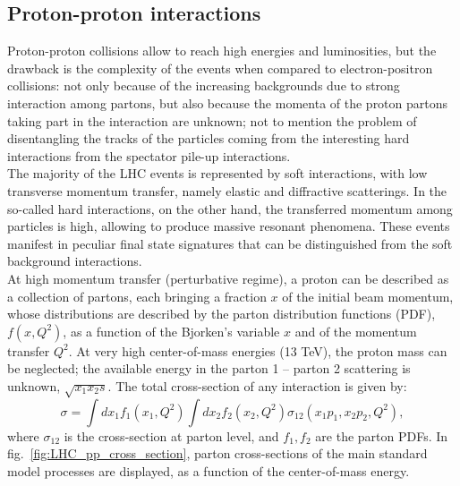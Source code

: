 \subsection{Proton-proton interactions}
\noindent Proton-proton collisions allow to reach high energies and luminosities, but the drawback is the complexity of the events when compared to electron-positron collisions: not only because of the increasing backgrounds due to strong interaction among partons, but also because the momenta of the proton partons taking part in the interaction are unknown; not to mention the problem of disentangling the tracks of the particles coming from the interesting hard interactions from the spectator pile-up interactions.\\
The majority of the LHC events is represented by soft interactions, with low transverse momentum transfer, namely elastic and diffractive scatterings. In the so-called hard interactions, on the other hand, the transferred momentum among particles is high, allowing to produce massive resonant phenomena. These events manifest in peculiar final state signatures that can be distinguished from the soft background interactions.\\
At high momentum transfer (perturbative regime), a proton can be described as a collection of partons, each bringing a fraction $x$ of the initial beam momentum, whose distributions are described by the parton distribution functions (PDF), $f(x,Q^2)$, as a function of the Bjorken's variable $x$ and of the momentum transfer $Q^2$. At very high center-of-mass energies (13 TeV), the proton mass can be neglected; the available energy in the parton 1 -- parton 2 scattering is unknown, $\sqrt{x_1 x_2 s}$. The total cross-section of any interaction is given by:
\begin{equation}
\sigma = \int dx_1 f_1(x_1,Q^2) \int dx_2 f_2(x_2,Q^2) \sigma_{12}(x_1 p_1, x_2 p_2, Q^2),
\end{equation}
where $\sigma_{12}$ is the cross-section at parton level, and $f_1,f_2$ are the parton PDFs. In fig.~\ref{fig:LHC_pp_cross_section}, parton cross-sections of the main standard model processes are displayed, as a function of the center-of-mass energy.

